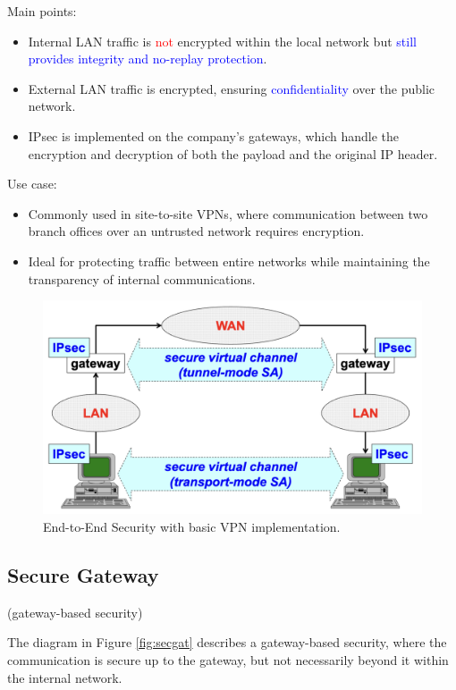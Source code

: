 Main points:
\begin{itemize}
    \item Internal LAN traffic is \textcolor{red}{not} encrypted within the local network but \textcolor{Blue}{still provides integrity and no-replay protection}.
    \item External LAN traffic is encrypted, ensuring \textcolor{Blue}{confidentiality} over the public network.
    \item IPsec is implemented on the company’s gateways, which handle the encryption and decryption of both the payload and the original IP header.
    \end{itemize}

Use case:
\begin{itemize}
\item Commonly used in site-to-site VPNs, where communication between two branch offices over an untrusted network requires encryption.
\item Ideal for protecting traffic between entire networks while maintaining the transparency of internal communications.
\end{itemize}

\begin{figure}[H]
    \includegraphics[width=\linewidth]{Images/NetSec/end_vpn.png}
    \caption{End-to-End Security with basic VPN implementation.}
    \label{fig:end_vpn}
\end{figure}

\subsection{Secure Gateway}
\begin{center}
    (gateway-based security)
\end{center}
The diagram in Figure \ref{fig:secgat} describes a gateway-based security, where the communication is secure up to the gateway, but not necessarily beyond it within the internal network.

